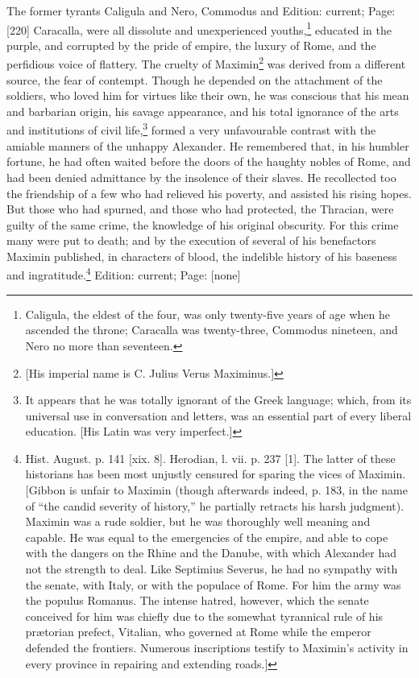 The former tyrants Caligula and Nero, Commodus and Edition: current; Page: [220] Caracalla, were all dissolute and unexperienced youths,\footnote{Caligula, the eldest of the four, was only twenty-five years of age when he ascended the throne; Caracalla was twenty-three, Commodus nineteen, and Nero no more than seventeen.} educated in the purple, and corrupted by the pride of empire, the luxury of Rome, and the perfidious voice of flattery. The cruelty of Maximin\footnote{[His imperial name is C. Julius Verus Maximinus.]} was derived from a different source, the fear of contempt. Though he depended on the attachment of the soldiers, who loved him for virtues like their own, he was conscious that his mean and barbarian origin, his savage appearance, and his total ignorance of the arts and institutions of civil life,\footnote{It appears that he was totally ignorant of the Greek language; which, from its universal use in conversation and letters, was an essential part of every liberal education. [His Latin was very imperfect.]} formed a very unfavourable contrast with the amiable manners of the unhappy Alexander. He remembered that, in his humbler fortune, he had often waited before the doors of the haughty nobles of Rome, and had been denied admittance by the insolence of their slaves. He recollected too the friendship of a few who had relieved his poverty, and assisted his rising hopes. But those who had spurned, and those who had protected, the Thracian, were guilty of the same crime, the knowledge of his original obscurity. For this crime many were put to death; and by the execution of several of his benefactors Maximin published, in characters of blood, the indelible history of his baseness and ingratitude.\footnote{Hist. August. p. 141 [xix. 8]. Herodian, l. vii. p. 237 [1]. The latter of these historians has been most unjustly censured for sparing the vices of Maximin. [Gibbon is unfair to Maximin (though afterwards indeed, p. 183, in the name of \texthebrew{“}the candid severity of history,\texthebrew{}” he partially retracts his harsh judgment). Maximin was a rude soldier, but he was thoroughly well meaning and capable. He was equal to the emergencies of the empire, and able to cope with the dangers on the Rhine and the Danube, with which Alexander had not the strength to deal. Like Septimius Severus, he had no sympathy with the senate, with Italy, or with the populace of Rome. For him the army was the populus Romanus. The intense hatred, however, which the senate conceived for him was chiefly due to the somewhat tyrannical rule of his prætorian prefect, Vitalian, who governed at Rome while the emperor defended the frontiers. Numerous inscriptions testify to Maximin\texthebrew{}’s activity in every province in repairing and extending roads.]}
Edition: current; Page: [none]

